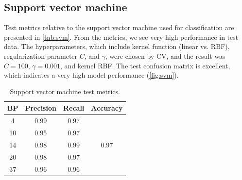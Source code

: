 \documentclass[twocolumn]{article}
\begin{document}
            \subsection{Support vector machine}

                  Test metrics relative to the support vector machine used for classification are presented in \autoref{tab:svm}. From the metrics, we see very high performance in test data. The hyperparameters, which include kernel function (linear vs. RBF), regularization parameter $C$, and $\gamma$, were chosen by CV, and the result was $C = 100$, $\gamma = 0.001$, and kernel RBF. The test confusion matrix is excellent, which indicates a very high model performance (\autoref{fig:svm}).
                  
                  \begin{table}[H]
                        \centering
                        \caption{Support vector machine test metrics.}
                        \label{tab:svm}
                        \begin{tabular}{c|cc|c}
                        BP & Precision & Recall & Accuracy              \\ \hline
                        4  & 0.99      & 0.97   & \multirow{5}{*}{0.97} \\
                        10 & 0.95      & 0.97   &                       \\
                        14 & 0.98      & 0.99   &                       \\
                        20 & 0.98      & 0.97   &                       \\
                        37 & 0.96      & 0.96   &                      
                        \end{tabular}
                  \end{table}
\end{document}
